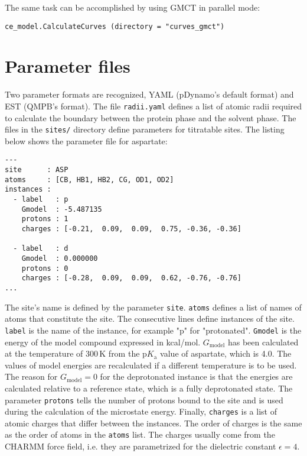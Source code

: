 \documentclass[a4paper,11pt]{article}
\newcommand{\pka}{$\mathrm{p}K_{\mathrm{a}}$\xspace}
\begin{document}
\bigskip
The same task can be accomplished by using GMCT in parallel mode:

{\footnotesize \begin{lstlisting}
ce_model.CalculateCurves (directory = "curves_gmct")
\end{lstlisting} }


\section{Parameter files}
Two parameter formats are recognized, 
YAML (pDynamo's default format) and EST (QMPB's format).
%
The file \texttt{radii.yaml} defines a list of atomic radii 
required to calculate the boundary between the protein phase and 
the solvent phase.
%
The files in the \texttt{sites/} directory define parameters for titratable 
sites.
%
The listing below shows the parameter file for aspartate:

\linespread{0.8}
{\footnotesize \begin{lstlisting}
---
site      : ASP
atoms     : [CB, HB1, HB2, CG, OD1, OD2]
instances :
  - label   : p
    Gmodel  : -5.487135
    protons : 1
    charges : [-0.21,  0.09,  0.09,  0.75, -0.36, -0.36]

  - label   : d
    Gmodel  : 0.000000
    protons : 0
    charges : [-0.28,  0.09,  0.09,  0.62, -0.76, -0.76]
...
\end{lstlisting} }
\linespread{1.6}


\bigskip
The site's name is defined by the parameter \texttt{site}. 
%
\texttt{atoms} defines a list of names of atoms that constitute the site.
%
The consecutive lines define instances of the site.
%
\texttt{label} is the name of the instance, for example "p" for "protonated".
%
\texttt{Gmodel} is the energy of the model compound expressed in kcal/mol.
%
$G_{\mathrm{model}}$ has been calculated at the temperature of 300\,K from the 
\pka value of aspartate, which is 4.0.
%
The values of model energies are recalculated if a different temperature is 
to be used.
%
The reason for $G_{\mathrm{model}} = 0$ for the deprotonated instance is that 
the energies are calculated relative to a reference state, which is a fully 
deprotonated state.
%
The parameter \texttt{protons} tells the number of protons bound to the site and 
is used during the calculation of the microstate energy.
%
Finally, \texttt{charges} is a list of atomic charges that differ between 
the instances.
%
The order of charges is the same as the order of atoms in the \texttt{atoms} list.
%
The charges usually come from the CHARMM force field, i.e. they are
parametrized for the dielectric constant $\epsilon = 4$.
\end{document}
